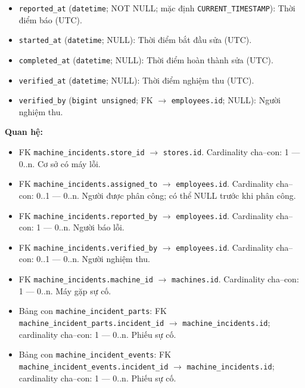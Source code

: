 \begin{itemize}
\item \texttt{reported\_at} (\texttt{datetime}; NOT NULL; mặc định \texttt{CURRENT\_TIMESTAMP}): Thời điểm báo (UTC).

\item \texttt{started\_at} (\texttt{datetime}; NULL): Thời điểm bắt đầu sửa (UTC).

\item \texttt{completed\_at} (\texttt{datetime}; NULL): Thời điểm hoàn thành sửa (UTC).

\item \texttt{verified\_at} (\texttt{datetime}; NULL): Thời điểm nghiệm thu (UTC).

\item \texttt{verified\_by} (\texttt{bigint unsigned}; FK $\rightarrow$ \texttt{employees.id}; NULL): Người nghiệm thu.

\end{itemize}

\textbf{Quan hệ:}

\begin{itemize}

\item FK \texttt{machine\_incidents.store\_id} $\rightarrow$ \texttt{stores.id}. Cardinality cha--con: 1 — 0..n. Cơ sở có máy lỗi.

\item FK \texttt{machine\_incidents.assigned\_to} $\rightarrow$ \texttt{employees.id}. Cardinality cha--con: 0..1 — 0..n. Người được phân công; có thể NULL trước khi phân công.

\item FK \texttt{machine\_incidents.reported\_by} $\rightarrow$ \texttt{employees.id}. Cardinality cha--con: 1 — 0..n. Người báo lỗi.

\item FK \texttt{machine\_incidents.verified\_by} $\rightarrow$ \texttt{employees.id}. Cardinality cha--con: 0..1 — 0..n. Người nghiệm thu.

\item FK \texttt{machine\_incidents.machine\_id} $\rightarrow$ \texttt{machines.id}. Cardinality cha--con: 1 — 0..n. Máy gặp sự cố.

\item Bảng con \texttt{machine\_incident\_parts}: FK \texttt{machine\_incident\_parts.incident\_id} $\rightarrow$ \texttt{machine\_incidents.id}; cardinality cha--con: 1 — 0..n. Phiếu sự cố.

\item Bảng con \texttt{machine\_incident\_events}: FK \texttt{machine\_incident\_events.incident\_id} $\rightarrow$ \texttt{machine\_incidents.id}; cardinality cha--con: 1 — 0..n. Phiếu sự cố.

\end{itemize}

